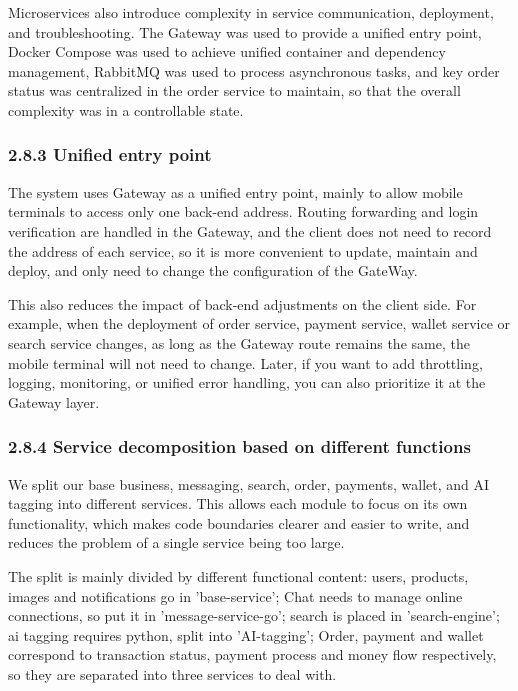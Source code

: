 \documentclass{article}
\begin{document}
Microservices also introduce complexity in service communication, deployment, and troubleshooting. The Gateway was used to provide a unified entry point, Docker Compose was used to achieve unified container and dependency management, RabbitMQ was used to process asynchronous tasks, and key order status was centralized in the order service to maintain, so that the overall complexity was in a controllable state.

\subsubsection{2.8.3 Unified entry point}

The system uses Gateway as a unified entry point, mainly to allow mobile terminals to access only one back-end address. Routing forwarding and login verification are handled in the Gateway, and the client does not need to record the address of each service, so it is more convenient to update, maintain and deploy, and only need to change the configuration of the GateWay.

This also reduces the impact of back-end adjustments on the client side. For example, when the deployment of order service, payment service, wallet service or search service changes, as long as the Gateway route remains the same, the mobile terminal will not need to change. Later, if you want to add throttling, logging, monitoring, or unified error handling, you can also prioritize it at the Gateway layer.

\subsubsection{2.8.4 Service decomposition based on different functions}

We split our base business, messaging, search, order, payments, wallet, and AI tagging into different services. This allows each module to focus on its own functionality, which makes code boundaries clearer and easier to write, and reduces the problem of a single service being too large.

The split is mainly divided by different functional content: users, products, images and notifications go in 'base-service'; Chat needs to manage online connections, so put it in 'message-service-go'; search is placed in 'search-engine'; ai tagging requires python, split into 'AI-tagging'; Order, payment and wallet correspond to transaction status, payment process and money flow respectively, so they are separated into three services to deal with.
\end{document}

